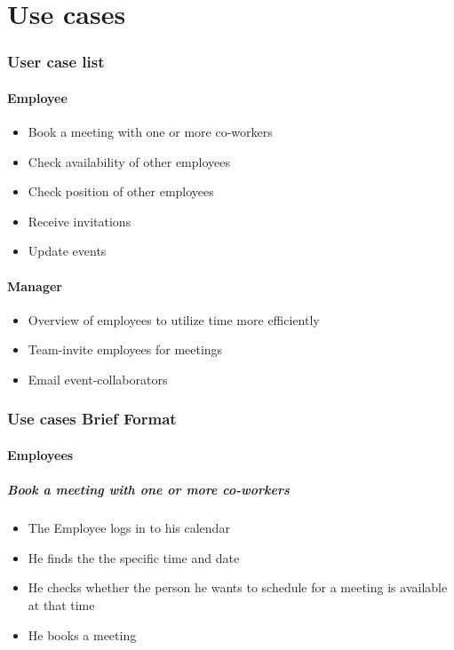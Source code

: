 \documentclass[10pt]{article}
\begin{document}
\part{Use cases}

\section{User case list}

\subsection{Employee}

\begin{itemize}
\item Book a meeting with one or more co-workers
\item Check availability of other employees
\item Check position of other employees
\item Receive invitations
\item Update events 
\end{itemize}


\subsection{Manager}
\begin{itemize}
\item Overview of employees to utilize time more efficiently
\item Team-invite employees for meetings
\item Email event-collaborators
\end{itemize}

\section{Use cases Brief Format}

\subsection{Employees}

\subsubsection{Book a meeting with one or more co-workers}

\begin{itemize}
\item The Employee logs in to his calendar 
\item He finds the the specific time and date 
\item He checks whether the person he wants to schedule for a meeting is available at that time 
\item He books a meeting
\end{itemize}
\end{document}
